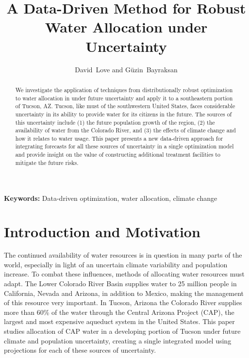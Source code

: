 \documentclass[11pt]{article}
\author{David~Love and G\"{u}zin~Bayraksan}
\title{A Data-Driven Method for Robust Water Allocation under Uncertainty}
\date{}
\newcommand{\keywords}[1]{\par\noindent\enspace\ignorespaces\textbf{Keywords:} #1}
\theoremstyle{plain}
\theoremstyle{definition}
\theoremstyle{remark}
\begin{document}

\maketitle

\begin{abstract}
	We investigate the application of techniques from distributionally robust optimization to water allocation in under future uncertainty and apply it to a southeastern portion of Tucson, AZ.
	Tucson, like must of the southwestern United States, faces considerable uncertainty in its ability to provide water for its citizens in the future.
	The sources of this uncertainty include (1) the future population growth of the region, (2) the availability of water from the Colorado River, and (3) the effects of climate change and how it relates to water usage.
	This paper presents a new data-driven approach for integrating forecasts for all these sources of uncertainty in a single optimization model and provide insight on the value of constructing additional treatment facilities to mitigate the future risks.
\end{abstract}

\keywords{Data-driven optimization, water allocation, climate change}

\section{Introduction and Motivation}

The continued availability of water resources is in question in many parts of the world, especially in light of an uncertain climate variability and population increase.
To combat these influences, methods of allocating water resources must adapt.
The Lower Colorado River Basin supplies water to 25 million people in California, Nevada and Arizona, in addition to Mexico, making the management of this resource very important.
In Tucson, Arizona the Colorado River supplies more than 60\% of the water through the Central Arizona Project (CAP), the largest and most expensive aqueduct system in the United States.
This paper studies allocation of CAP water in a developing portion of Tucson under future climate and population uncertainty, creating a single integrated model using projections for each of these sources of uncertainty.
\end{document}
